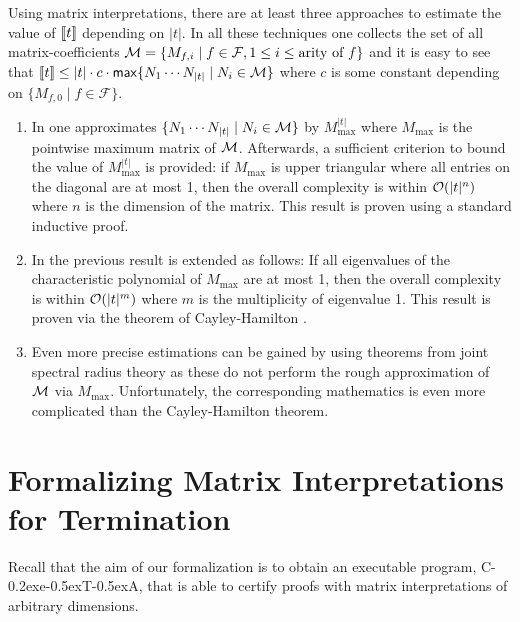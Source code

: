 \documentclass[a4paper]{llncs}
\newcommand\ceta{\textsf{C\kern-0.2exe\kern-0.5exT\kern-0.5exA}\xspace}
\newcommand\FF{\mathcal{F}}
\begin{document}
Using matrix interpretations, there are at least three approaches to estimate
the value of $[\![t]\!]$ depending on $|t|$.
In all these techniques one collects the set of all matrix-coefficients 
$\MM = \{M_{f,i} \mid f \in \FF, 1 \leq i \leq \text{arity of $f$}\}$
and it is easy to see that $[\![t]\!] \leq |t| \cdot c \cdot \mathsf{max} \{ N_1\cdots N_{|t|} \mid N_i \in {\cal M}\}$ where $c$ is some constant depending on $\{M_{f,0} \mid f \in \FF\}$.

\begin{enumerate}
\item 
\label{easy}
In \cite{MSW08} one approximates $\{ N_1\cdots N_{|t|} \mid N_i \in {\cal M}\}$
  by $M_\max^{|t|}$ where $M_\max$ is the pointwise maximum matrix of ${\cal M}$.
  Afterwards, a sufficient criterion to bound
  the value of $M_\max^{|t|}$ is provided: if $M_\max$ is upper triangular where all
  entries on the diagonal are at most 1, then the overall complexity is within
  ${\cal O}(|t|^n)$ where $n$ is the dimension of the matrix. This result is proven
  using a standard inductive proof.
\item 
\label{cayley}
In \cite{NZM10} the previous result is extended 
  as follows:
  If all eigenvalues of the characteristic polynomial of $M_\max$ 
  are at most 1, then the overall complexity is 
  within ${\cal O}(|t|^m)$ where $m$ is the multiplicity of eigenvalue 1.
  This result is proven via the theorem of Cayley-Hamilton \cite{Rose}.
\item 
\label{joint}
Even more precise estimations can be gained by using theorems from joint
  spectral radius theory \cite{JSR,CAI11} as these do not perform the rough 
  approximation of
  ${\cal M}$ via $M_\max$. Unfortunately, the corresponding mathematics 
   is even
  more complicated than the Cayley-Hamilton theorem.
\end{enumerate}


\section{Formalizing Matrix Interpretations for Termination}
\label{matrix}

Recall that the aim of our formalization is to
obtain an executable program, \ceta, that is able to certify
proofs with matrix interpretations of arbitrary dimensions.
\end{document}
